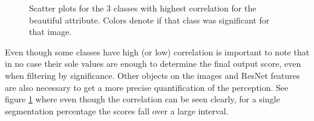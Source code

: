 \begin{figure}[ht]
	\centering
	\hspace{0mm}
	\caption[Score vs segmentation scatter plots]{
		Scatter plots for the 3 classes with highest correlation for the beautiful attribute.
		Colors denote if that class was significant for that image.
	}
	\label{fig:scatters}
\end{figure}

Even though some classes have high (or low) correlation is important to note that in no case
their sole values are enough to determine the final output score, even when filtering by significance.
Other objects on the images and ResNet features are also necessary to get a more precise
quantification of the perception. See figure \ref{fig:scatters} where even though the correlation
can be seen clearly, for a single segmentation percentage the scores fall over a large interval.

